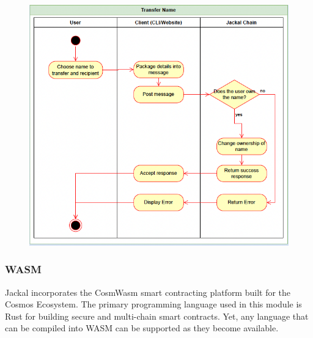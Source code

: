 \documentclass[a4paper]{article}
\begin{document}
\begin{figure}[!htbp]
\centering
\includegraphics[width=1\textwidth]{assets/rns7.png}
\caption{}
\end{figure}

\newpage
\subsubsection{WASM}
Jackal incorporates the CosmWasm \cite{cosmwasm} smart contracting platform built for the Cosmos Ecosystem. The primary programming language used in this module is Rust for building secure and multi-chain smart contracts. Yet, any language that can be compiled into WASM can be supported as they become available. 
\end{document}
